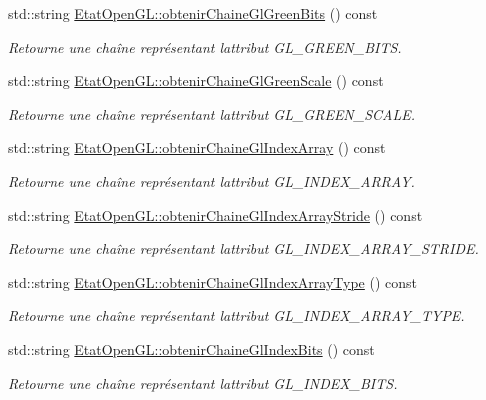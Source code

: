 \begin{DoxyCompactItemize}
std\+::string \hyperlink{group__utilitaire_ga418e82a0a01a9dfe598780e602b41b2f}{Etat\+Open\+G\+L\+::obtenir\+Chaine\+Gl\+Green\+Bits} () const 
\begin{DoxyCompactList}\small\item\em Retourne une chaîne représentant l\textquotesingle{}attribut G\+L\+\_\+\+G\+R\+E\+E\+N\+\_\+\+B\+I\+T\+S. \end{DoxyCompactList}\item 
std\+::string \hyperlink{group__utilitaire_ga933583938ec361ea302f25dd1323b541}{Etat\+Open\+G\+L\+::obtenir\+Chaine\+Gl\+Green\+Scale} () const 
\begin{DoxyCompactList}\small\item\em Retourne une chaîne représentant l\textquotesingle{}attribut G\+L\+\_\+\+G\+R\+E\+E\+N\+\_\+\+S\+C\+A\+L\+E. \end{DoxyCompactList}\item 
std\+::string \hyperlink{group__utilitaire_ga63a264a046b4714154de9f26b04ab1f8}{Etat\+Open\+G\+L\+::obtenir\+Chaine\+Gl\+Index\+Array} () const 
\begin{DoxyCompactList}\small\item\em Retourne une chaîne représentant l\textquotesingle{}attribut G\+L\+\_\+\+I\+N\+D\+E\+X\+\_\+\+A\+R\+R\+A\+Y. \end{DoxyCompactList}\item 
std\+::string \hyperlink{group__utilitaire_ga79b9f3969a037a0ed02684b41a8a1328}{Etat\+Open\+G\+L\+::obtenir\+Chaine\+Gl\+Index\+Array\+Stride} () const 
\begin{DoxyCompactList}\small\item\em Retourne une chaîne représentant l\textquotesingle{}attribut G\+L\+\_\+\+I\+N\+D\+E\+X\+\_\+\+A\+R\+R\+A\+Y\+\_\+\+S\+T\+R\+I\+D\+E. \end{DoxyCompactList}\item 
std\+::string \hyperlink{group__utilitaire_ga8479c06a3ede7442505bb38803be818f}{Etat\+Open\+G\+L\+::obtenir\+Chaine\+Gl\+Index\+Array\+Type} () const 
\begin{DoxyCompactList}\small\item\em Retourne une chaîne représentant l\textquotesingle{}attribut G\+L\+\_\+\+I\+N\+D\+E\+X\+\_\+\+A\+R\+R\+A\+Y\+\_\+\+T\+Y\+P\+E. \end{DoxyCompactList}\item 
std\+::string \hyperlink{group__utilitaire_gae88fc4ca05d447c04f08671823a407a3}{Etat\+Open\+G\+L\+::obtenir\+Chaine\+Gl\+Index\+Bits} () const 
\begin{DoxyCompactList}\small\item\em Retourne une chaîne représentant l\textquotesingle{}attribut G\+L\+\_\+\+I\+N\+D\+E\+X\+\_\+\+B\+I\+T\+S. \end{DoxyCompactList}\item 

\end{DoxyCompactItemize}
